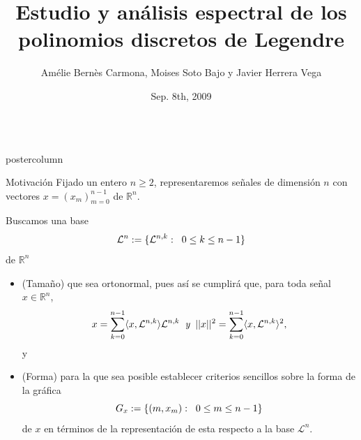 \documentclass[final,hyperref={pdfpagelabels=false}]{beamer}
\title{\huge Estudio y an\'alisis espectral de los polinomios discretos de Legendre}
\author{Am\'elie Bern\`es Carmona, Moises Soto Bajo y Javier Herrera Vega}
\institute[BUAP]{Benem\'erita Universidad Auton\'oma de Puebla}
\date[Sep. 8th, 2009]{Sep. 8th, 2009}
\newcommand{\IR}{\mathbb{R}}
\newcommand{\suma}[3]{\sum\limits_{#1}^{#2}#3} %
\newcommand{\cali}[1]{\mathcal{#1}} %
\newlength{\columnheight}
\begin{document}
\begin{frame}
  \begin{columns}
    \begin{column}{.49\textwidth}
      \begin{beamercolorbox}[center,wd=\textwidth]{postercolumn}
                              
            \begin{block}{Motivaci\'on}
            Fijado un entero $n \geq 2$, representaremos se\~nales
            de dimensi\'on $n$ con vectores $x = (x_{m})_{m=0}^{n-1}$
            de $\IR^{n}$.
     
            Buscamos una base
            $$\cali{L}^{n} := \{ \cali{L}^{n,k} : \hspace{0.2cm} 0 \leq k \leq n-1 \}$$
            de $\IR^{n}$
              \begin{itemize}
              
             \item (\textcolor{i6colorblockbg}{Tama\~no}) 
			que sea ortonormal, pues as\'i se cumplir\'a que,
			para toda se\~nal $x \in \IR^{n}$, 
			\[
			x = \suma{k=0}{n-1}{\langle x, \cali{L}^{n,k} \rangle \cali{L}^{n,k}}
			\hspace{0.2cm} \textit{y} \hspace{0.2cm}
			||x||^{2} = \suma{k=0}{n-1}{\langle x, \cali{L}^{n,k} \rangle^{2}},
			\]
			y
	           
	        \item (\textcolor{i6colorblockbg}{Forma}) 
	        para la que sea posible establecer criterios
			sencillos sobre la forma de la gr\'afica  
			\[
			G_{x} := \{ (m, x_{m}): \hspace{0.2cm} 0 \leq m \leq n-1 \}
			\]			
			de $x$ en t\'erminos
			de la representaci\'on de esta respecto a la base $\cali{L}^{n}$.
               \end{itemize}
               

\end{block}
\end{beamercolorbox}
\end{column}
\end{columns}
\end{frame}
\end{document}
